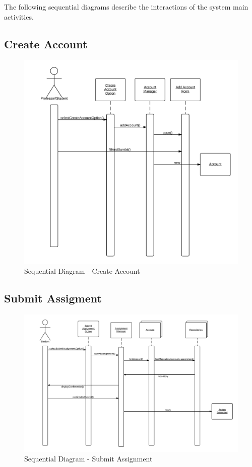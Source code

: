 \label{sec:seqs}
The following sequential diagrams describe the interactions of the system main activities.

\subsection*{Create Account}
\begin{figure}[H]
	\centering
	\includegraphics[width=\textwidth]{img/seqCreateAccount}
	\caption{Sequential Diagram - Create Account}
\end{figure}
\subsection*{Submit Assigment}
\begin{figure}[H]
	\centering
	\includegraphics[width=\textwidth]{img/seqSubmitAssign}
	\caption{Sequential Diagram - Submit Assignment}
\end{figure}
